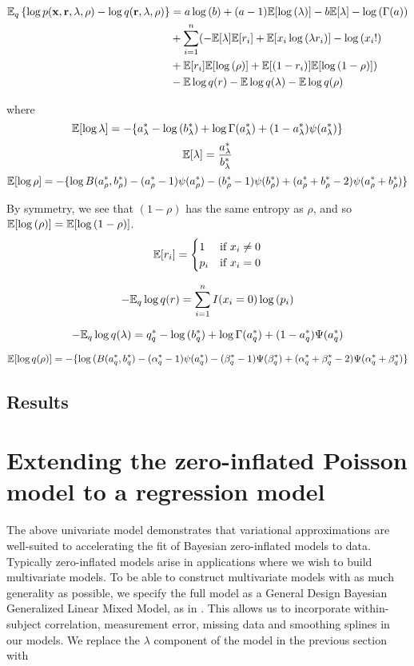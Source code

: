 \documentclass{amsart}
\begin{document}
\begin{align*}
\mathbb{E}_q \left\{ \log{p(\bf x, \bf r, \lambda, \rho)} - \log{q(\bf r, \lambda, \rho)} \right\} &= 
a \log{(b)} + (a - 1) \mathbb{E}[\log{(\lambda)}] - b \mathbb{E} [\lambda] - \log{(\Gamma(a))} \\
&+ \sum_{i=1}^n  ( -\mathbb{E} [\lambda] \mathbb{E} [r_i] + \mathbb{E}[x_i \log{(\lambda r_i)}] - \log{(x_i!)} \\
&+ \mathbb{E}[r_i] \mathbb{E}[\log{(\rho)}] + \mathbb{E}[(1 - r_i)] \mathbb{E}[\log{(1 - \rho)}] ) \\
& - \mathbb{E} \log{q(r)} - \mathbb{E} \log{q(\lambda)} - \mathbb{E} \log{q(\rho)}
\end{align*}

where
$$
\mathbb{E} [\log{\lambda}] = -\{ a_\lambda^* - \log{(b_\lambda^*)} + \log{\Gamma(a_\lambda^*)} + (1 - a_\lambda^*) \psi{(a_\lambda^*)} \} \\
$$
$$
\mathbb{E} [\lambda] = \frac{a_\lambda^*}{b_\lambda^*} \\
$$
$$
\mathbb{E}[\log{\rho}] = - \{ \log{B(a_\rho^*, b_\rho^*)} - (a_\rho^* - 1) \psi{(a_\rho^*)} - (b_\rho^* - 1)\psi{(b_\rho^*)} + (a_\rho^* + b_\rho^* - 2)\psi{(a_\rho^* + b_\rho^*)} \} \\
$$

By symmetry, we see that $(1 - \rho)$ has the same entropy as $\rho$,
and so $\mathbb{E} [\log{(\rho)}] = \mathbb{E} [\log{(1 - \rho)}]$.
$$
\mathbb{E}[r_i] = 
	\begin{cases}
	1 & \text{if } x_i \ne 0 \\
	p_i & \text{if } x_i = 0 \\
	\end{cases}
$$

$$
-\mathbb{E}_q \log{q(r)} = \sum_{i=1}^n I(x_i = 0) \log{(p_i)}
$$

$$
-\mathbb{E}_q \log{q(\lambda)} = q_q^* - \log{(b_q^*)} + \log{\Gamma{(a_q^*)}} + (1 - a_q^*) \Psi{(a_q^*)}
$$

$$
\mathbb{E}[\log{q(\rho)}] = - \{ \log{(B(a_q^*, b_q^*)} - (\alpha_q^* - 1) \psi{(a_q^*)} - (\beta_q^* - 1)\Psi{(\beta_q^*)} + (\alpha_q^* + \beta_q^* - 2)\Psi{(\alpha_q^* + \beta_q^*)} \}
$$

\subsection{Results}

\section{Extending the zero-inflated Poisson model to a regression model}
The above univariate model demonstrates that variational approximations are well-suited
to accelerating the fit of Bayesian zero-inflated models to data. Typically zero-inflated
models arise in applications where we wish to build multivariate models. To be able to
construct multivariate models with as much generality as possible, we specify the full
model as a General Design Bayesian Generalized Linear Mixed Model, as in \cite{zhao06}.
This allows us to incorporate within-subject correlation, measurement error, missing data
and smoothing splines in our models. We replace the $\lambda$ component of the model
in the previous section with
\end{document}
